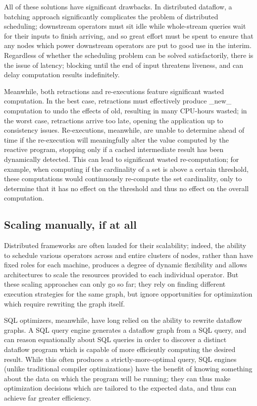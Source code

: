All of these solutions have significant drawbacks.  In distributed dataflow, a batching approach significantly complicates the problem of distributed scheduling; downstream operators must sit idle while whole-stream queries wait for their inputs to finish arriving, and so great effort must be spent to ensure that any nodes which power downstream operators are put to good use in the interim. Regardless of whether the scheduling problem can be solved satisfactorily, there is the issue of latency; blocking until the end of input threatens liveness, and can delay computation results indefinitely. 

Meanwhile, both retractions and re-executions feature significant wasted computation.  In the best case, retractions must effectively produce _new_ computation to undo the effects of old, resulting in many CPU-hours wasted; in the worst case, retractions arrive too late, opening the application up to consistency issues.  Re-executions, meanwhile, are unable to determine ahead of time if the re-execution will meaningfully alter the value computed by the reactive program, stopping only if a cached intermediate result has been dynamically detected.  This can lead to significant wasted re-computation; for example, when computing if the cardinality of a set is above a certain threshold, these computations would continuously re-compute the set cardinality, only to determine that it has no effect on the threshold and thus no effect on the overall computation. 

\subsection{Scaling manually, if at all}

Distributed frameworks are often lauded for their scalability; indeed, the ability to schedule various operators across and entire clusters of nodes, rather than have fixed roles for each machine, produces a degree of dynamic flexibility and allows architectures to scale the resources provided to each individual operator.  But these scaling approaches can only go so far; they rely on finding different execution strategies for the same graph, but ignore opportunities for optimization which require rewriting the graph itself. 

SQL optimizers, meanwhile, have long relied on the ability to rewrite dataflow graphs. A SQL query engine generates a dataflow graph from a SQL query, and can reason equationally about SQL queries in order to discover a distinct dataflow program which is capable of more efficiently computing the desired result. While this often produces a strictly-more-optimal query, SQL engines (unlike traditional compiler optimizations) have the benefit of knowing something about the data on which the program will be running; they can thus make optimization decisions which are tailored to the expected data, and thus can achieve far greater efficiency. 

